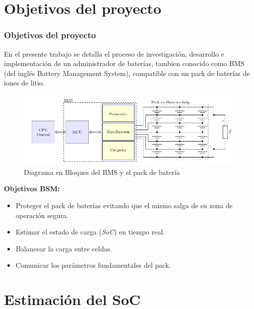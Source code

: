 \documentclass[10pt]{beamer}
\theoremstyle{remark}
\theoremstyle{definition}
\begin{document}
\section{Objetivos del proyecto}

\begin{frame}[allowframebreaks]
    \frametitle{Objetivos del proyecto}

    En el presente trabajo se detalla el proceso de investigaci\'on, desarrollo e
    implementaci\'on de un administrador de bater\'ias, tambien conocido como BMS (del
    ingl\'es Battery Management System), compatible con un pack de bater\'ias de iones
    de litio.

    \vspace{10mm}

    \begin{figure}[h!]
        \includegraphics[width=1\textwidth]{./images/db_bms.png}
        \caption{Diagrama en Bloques del BMS y el pack de bater\'ia}
        \label{fig:r_ohm_result}
    \end{figure}

    \newpage

    \textbf{Objetivos BSM:}
    \begin{itemize}
        \item Proteger el pack de bater\'ias evitando que el mismo salga de su
            zona de operaci\'on segura.
        \item Estimar el estado de carga (\emph{SoC}) en tiempo real.
        \item Balancear la carga entre celdas.
        \item Comunicar los par\'ametros fundamentales del pack.
    \end{itemize}
\end{frame}

\section{Estimación del SoC}
\end{document}
